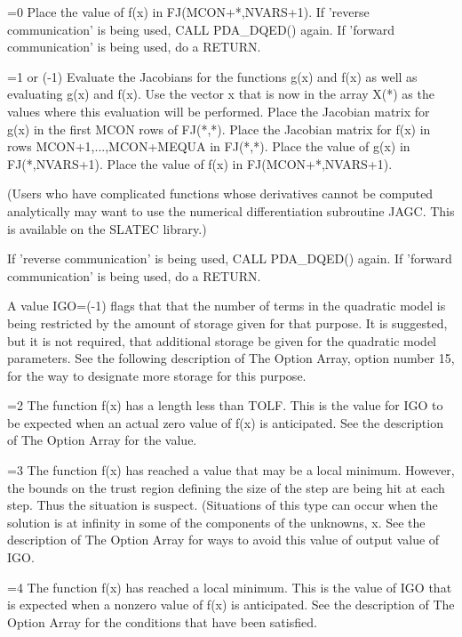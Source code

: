 \documentclass[11pt,twoside,nolof]{starlink}
\begin{document}
\begin{terminalv}
      =0   Place  the  value  of  f(x)  in FJ(MCON+*,NVARS+1).  If
  'reverse  communication'  is  being used, CALL PDA_DQED() again.  If
  'forward communication' is being used, do a RETURN.

      =1  or  (-1)   Evaluate the Jacobians for the functions g(x)
  and  f(x) as well as evaluating g(x) and f(x).  Use the vector x
  that is now in the array X(*) as the values  where this
  evaluation  will  be performed.  Place the Jacobian matrix
  for  g(x) in the first MCON rows of FJ(*,*).  Place the Jacobian
  matrix for f(x) in rows MCON+1,...,MCON+MEQUA in FJ(*,*).  Place
  the  value of g(x) in FJ(*,NVARS+1).  Place the value of f(x) in
  FJ(MCON+*,NVARS+1).

  (Users who have complicated functions whose derivatives cannot be
  computed analytically may want to use the numerical differentiation
  subroutine JAGC.  This is available on the SLATEC library.)

  If  'reverse communication' is being used, CALL PDA_DQED() again.
  If 'forward communication' is being used, do a RETURN.

  A  value  IGO=(-1)  flags  that  that the number of terms in the
  quadratic  model  is  being  restricted by the amount of storage
  given  for  that  purpose.   It  is  suggested,  but  it  is not
  required,  that  additional  storage  be given for the quadratic
  model  parameters.   See the following description of The Option
  Array,  option  number 15, for the way to designate more storage
  for this purpose.

      =2   The function f(x) has a length less than TOLF.  This is
  the  value  for  IGO to be expected when an actual zero value of
  f(x)  is  anticipated.   See the description of The Option Array
  for the value.

      =3   The  function  f(x)  has  reached a value that may be a
  local   minimum.   However,  the  bounds  on  the  trust  region
  defining  the size of the step are being hit at each step.  Thus
  the  situation  is  suspect.  (Situations of this type can occur
  when  the  solution  is at infinity in some of the components of
  the   unknowns,  x.  See the description of The Option Array for
  ways to avoid this value of output value of IGO.

      =4   The function f(x) has reached a local minimum.  This is
  the  value  of IGO that is expected when a nonzero value of f(x)
  is anticipated.  See the description of The Option Array for the
  conditions that have been satisfied.


\end{terminalv}
\end{document}
